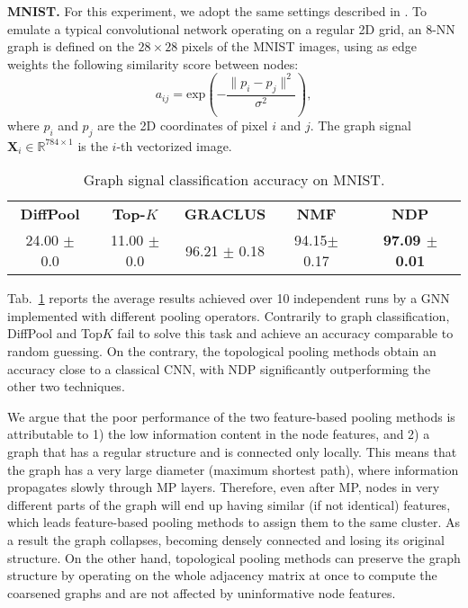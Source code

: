 \documentclass[journal]{IEEEtran}
\def\X{{\mathbf X}}
\begin{document}
\textbf{MNIST.} 
For this experiment, we adopt the same settings described in \cite{defferrard2016convolutional}.
To emulate a typical convolutional network operating on a regular 2D grid, an 8-NN graph is defined on the $28 \times 28$ pixels of the MNIST images, using as edge weights the following similarity score between nodes:
\begin{equation}
\label{eq:edges}
    a_{ij} = \mathrm{exp}\left(- \frac{\| p_i - p_j \|^2}{\sigma^2}\right),
\end{equation}
where $p_i$ and $p_j$ are the 2D coordinates of pixel $i$ and $j$.
The graph signal $\X_i \in \mathbb{R}^{784 \times 1}$ is the $i$-th vectorized image.

\begin{table}
\setlength\tabcolsep{.7em} \small
\bgroup
\def\arraystretch{1.25} \centering
\caption{Graph signal classification accuracy on MNIST.}
\begin{tabular}{ccccc}
\cmidrule[1.5pt]{1-5}
\textbf{DiffPool} & \textbf{Top-$K$} & \textbf{GRACLUS} & \textbf{NMF} & \textbf{NDP} \\
\cmidrule[.5pt]{1-5}
24.00 {\tiny$\pm$ 0.0} & 11.00 {\tiny$\pm$ 0.0} & 96.21 {\tiny$\pm$ 0.18} & 94.15{\tiny$\pm$ 0.17} & \textbf{97.09 {\tiny$\pm$ 0.01}} \\
\cmidrule[1.5pt]{1-5}
\end{tabular}
\label{tab:mnist_res}
\egroup
\end{table}


Tab.~\ref{tab:mnist_res} reports the average results achieved over 10 independent runs by a GNN implemented with different pooling operators.
Contrarily to graph classification, DiffPool and Top$K$ fail to solve this task and achieve an accuracy comparable to random guessing. 
On the contrary, the topological pooling methods obtain an accuracy close to a classical CNN, with NDP significantly outperforming the other two techniques. 

We argue that the poor performance of the two feature-based pooling methods is attributable to 1) the low information content in the node features, and 2) a graph that has a regular structure and is connected only locally. 
This means that the graph has a very large diameter (maximum shortest path), where information propagates slowly through MP layers.
Therefore, even after MP, nodes in very different parts of the graph will end up having similar (if not identical) features, which leads feature-based pooling methods to assign them to the same cluster.
As a result the graph collapses, becoming densely connected and losing its original structure.
On the other hand, topological pooling methods can preserve the graph structure by operating on the whole adjacency matrix at once to compute the coarsened graphs and are not affected by uninformative node features.
\end{document}
